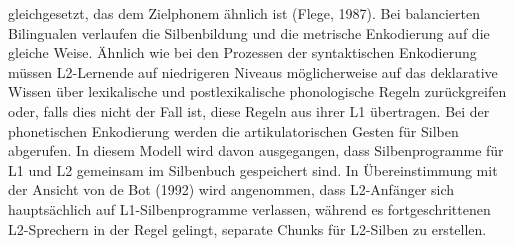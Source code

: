 \documentclass[
  letterpaper,
]{scrbook}
\begin{document}
gleichgesetzt, das dem Zielphonem ähnlich ist (Flege, 1987). Bei
balancierten Bilingualen verlaufen die Silbenbildung und die metrische
Enkodierung auf die gleiche Weise. Ähnlich wie bei den Prozessen der
syntaktischen Enkodierung müssen L2-Lernende auf niedrigeren Niveaus
möglicherweise auf das deklarative Wissen über lexikalische und
postlexikalische phonologische Regeln zurückgreifen oder, falls dies
nicht der Fall ist, diese Regeln aus ihrer L1 übertragen. Bei der
phonetischen Enkodierung werden die artikulatorischen Gesten für Silben
abgerufen. In diesem Modell wird davon ausgegangen, dass Silbenprogramme
für L1 und L2 gemeinsam im Silbenbuch gespeichert sind. In
Übereinstimmung mit der Ansicht von de Bot (1992) wird angenommen, dass
L2-Anfänger sich hauptsächlich auf L1-Silbenprogramme verlassen, während
es fortgeschrittenen L2-Sprechern in der Regel gelingt, separate Chunks
für L2-Silben zu erstellen.
\end{document}
